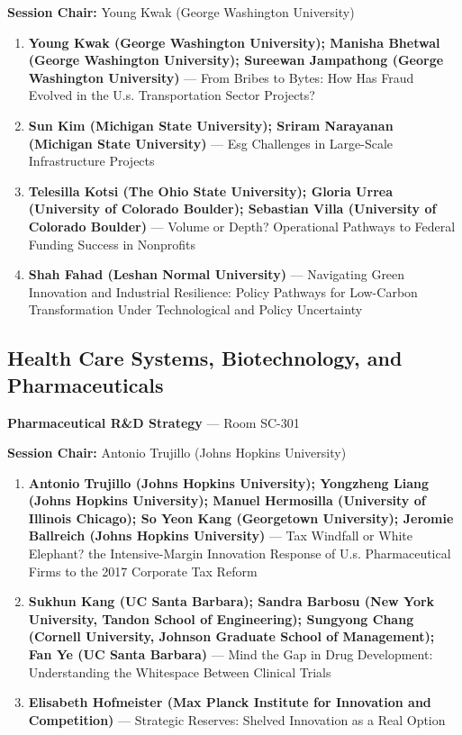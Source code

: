 \documentclass[
  10pt,
  letterpaper,
  DIV=11,
  numbers=noendperiod]{scrartcl}
\begin{document}
\textbf{Session Chair:} Young Kwak (George Washington University)

\begin{enumerate}
\def\labelenumi{\arabic{enumi}.}
\item
  \textbf{Young Kwak (George Washington University); Manisha Bhetwal
  (George Washington University); Sureewan Jampathong (George Washington
  University)} --- From Bribes to Bytes: How Has Fraud Evolved in the
  U.s. Transportation Sector Projects?
\item
  \textbf{Sun Kim (Michigan State University); Sriram Narayanan
  (Michigan State University)} --- Esg Challenges in Large-Scale
  Infrastructure Projects
\item
  \textbf{Telesilla Kotsi (The Ohio State University); Gloria Urrea
  (University of Colorado Boulder); Sebastian Villa (University of
  Colorado Boulder)} --- Volume or Depth? Operational Pathways to
  Federal Funding Success in Nonprofits
\item
  \textbf{Shah Fahad (Leshan Normal University)} --- Navigating Green
  Innovation and Industrial Resilience: Policy Pathways for Low-Carbon
  Transformation Under Technological and Policy Uncertainty
\end{enumerate}

\subsection{\texorpdfstring{\textcolor{health}{Health Care Systems, Biotechnology, and Pharmaceuticals}}{}}\label{section-54}

\textbf{Pharmaceutical R\&D Strategy} --- Room SC-301

\textbf{Session Chair:} Antonio Trujillo (Johns Hopkins University)

\begin{enumerate}
\def\labelenumi{\arabic{enumi}.}
\item
  \textbf{Antonio Trujillo (Johns Hopkins University); Yongzheng Liang
  (Johns Hopkins University); Manuel Hermosilla (University of Illinois
  Chicago); So Yeon Kang (Georgetown University); Jeromie Ballreich
  (Johns Hopkins University)} --- Tax Windfall or White Elephant? the
  Intensive-Margin Innovation Response of U.s. Pharmaceutical Firms to
  the 2017 Corporate Tax Reform
\item
  \textbf{Sukhun Kang (UC Santa Barbara); Sandra Barbosu (New York
  University, Tandon School of Engineering); Sungyong Chang (Cornell
  University, Johnson Graduate School of Management); Fan Ye (UC Santa
  Barbara)} --- Mind the Gap in Drug Development: Understanding the
  Whitespace Between Clinical Trials
\item
  \textbf{Elisabeth Hofmeister (Max Planck Institute for Innovation and
  Competition)} --- Strategic Reserves: Shelved Innovation as a Real
  Option
\end{enumerate}
\end{document}
